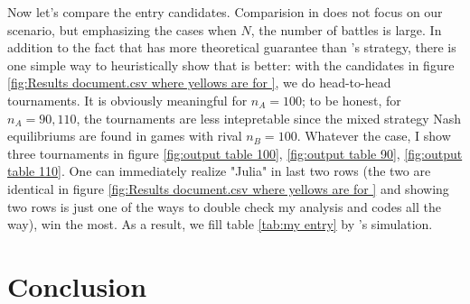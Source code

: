 \documentclass[aos,preprint]{imsart}  %
\numberwithin{table}{section} %
\theoremstyle{plain}
\theoremstyle{plain}
\theoremstyle{TheoremNum}
\newcommand{\1}{{\bf 1}}
\newcommand{\0}{{\vec{\mathbf{0}}}}
\numberwithin{equation}{section}
\begin{document}
Now let's compare the entry candidates. Comparision in \citep{vu2018efficient} does not focus on our scenario, but emphasizing the cases when $N$, the number of battles is large. In addition to the fact that \citep{behnezhad2017faster} has more theoretical guarantee than \citep{vu2018efficient}'s strategy, there is one simple way to heuristically show that \citep{behnezhad2017faster} is better: with the candidates in figure \ref{fig:Results document.csv where yellows are for }, we do head-to-head tournaments. It is obviously meaningful for $n_A=100$; to be honest, for $n_A=90, 110$, the tournaments are less intepretable since the mixed strategy Nash equilibriums are found in games with rival $n_B= 100$. Whatever the case, I show three tournaments in figure \ref{fig:output table 100}, \ref{fig:output table 90}, \ref{fig:output table 110}. One can immediately realize "Julia"  in last two rows (the two are identical in figure \ref{fig:Results document.csv where yellows are for } and showing two rows is just one of the ways to double check my analysis and codes all the way), win the most. As a result, we fill table \ref{tab:my entry} by \citep{behnezhad2017faster}'s simulation.


\section{Conclusion}
\end{document}
